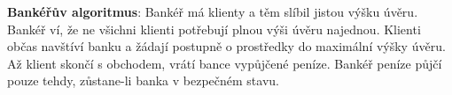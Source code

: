 \textbf{Bankéřův algoritmus}: Bankéř má klienty a těm slíbil jistou výšku úvěru. Bankéř ví, že ne všichni klienti potřebují plnou výši úvěru najednou. Klienti občas navštíví banku a žádají postupně o prostředky do maximální výšky úvěru. Až klient skončí s obchodem, vrátí bance vypůjčené peníze. Bankéř peníze půjčí pouze tehdy, zůstane-li banka v bezpečném stavu.
